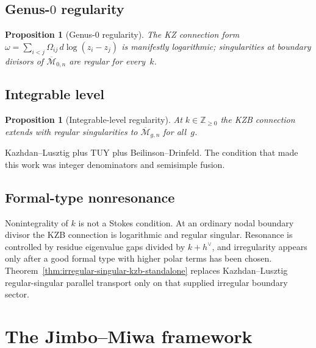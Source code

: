 \documentclass[11pt]{amsart}
\newtheorem{proposition}[theorem]{Proposition}
\theoremstyle{definition}
\theoremstyle{remark}
\providecommand{\Mbar}{\overline{\mathcal{M}}}
\begin{document}
\subsection{Genus-$0$ regularity}

\begin{proposition}[Genus-$0$ regularity]
\label{prop:kz-g0}
The KZ connection form $\omega = \sum_{i<j} \Omega_{ij}\, d\log(z_i -
z_j)$ is manifestly logarithmic; singularities at boundary divisors
of $\Mbar_{0,n}$ are regular for every~$k$.
\end{proposition}

\subsection{Integrable level}

\begin{proposition}[Integrable-level regularity]
\label{prop:kl-tuy-regular}
At $k \in \mathbb{Z}_{\geq 0}$ the KZB connection extends with
regular singularities to $\Mbar_{g,n}$ for all~$g$.
\end{proposition}

Kazhdan--Lusztig plus TUY plus Beilinson--Drinfeld. The
condition that made this work was integer denominators and
semisimple fusion.

\subsection{Formal-type nonresonance}

Nonintegrality of $k$ is not a Stokes condition.  At an ordinary
nodal boundary divisor the KZB connection is logarithmic and regular
singular.  Resonance is controlled by residue eigenvalue gaps divided
by $k+h^\vee$, and irregularity appears only after a good formal type
with higher polar terms has been chosen.  Theorem~\ref{thm:irregular-singular-kzb-standalone}
replaces Kazhdan--Lusztig regular-singular parallel transport only on
that supplied irregular boundary sector.

\section{The Jimbo--Miwa framework}
\end{document}
